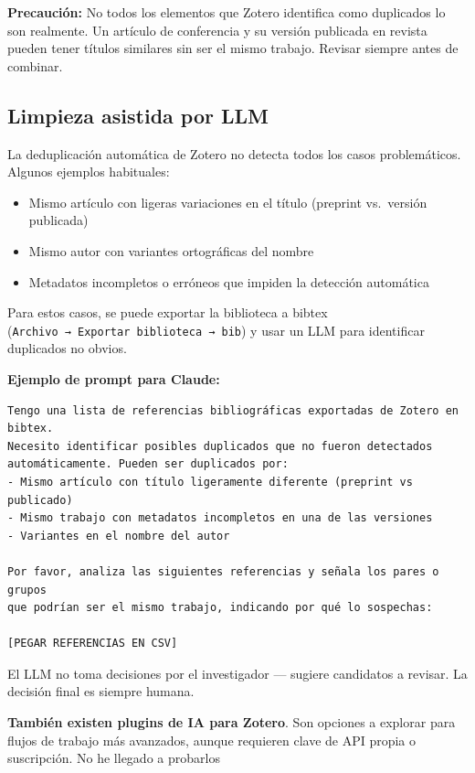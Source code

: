 \documentclass[
]{book}
\providecommand{\tightlist}{%
  \setlength{\itemsep}{0pt}\setlength{\parskip}{0pt}}
\begin{document}
\textbf{Precaución:} No todos los elementos que Zotero identifica como duplicados lo son realmente. Un artículo de conferencia y su versión publicada en revista pueden tener títulos similares sin ser el mismo trabajo. Revisar siempre antes de combinar.

\subsection{Limpieza asistida por LLM}\label{limpieza-asistida-por-llm}

La deduplicación automática de Zotero no detecta todos los casos problemáticos. Algunos ejemplos habituales:

\begin{itemize}
\tightlist
\item
  Mismo artículo con ligeras variaciones en el título (preprint vs.~versión publicada)
\item
  Mismo autor con variantes ortográficas del nombre
\item
  Metadatos incompletos o erróneos que impiden la detección automática
\end{itemize}

Para estos casos, se puede exportar la biblioteca a bibtex (\texttt{Archivo\ →\ Exportar\ biblioteca\ →\ bib}) y usar un LLM para identificar duplicados no obvios.

\textbf{Ejemplo de prompt para Claude:}

\begin{verbatim}
Tengo una lista de referencias bibliográficas exportadas de Zotero en bibtex.
Necesito identificar posibles duplicados que no fueron detectados
automáticamente. Pueden ser duplicados por:
- Mismo artículo con título ligeramente diferente (preprint vs publicado)
- Mismo trabajo con metadatos incompletos en una de las versiones
- Variantes en el nombre del autor

Por favor, analiza las siguientes referencias y señala los pares o grupos
que podrían ser el mismo trabajo, indicando por qué lo sospechas:

[PEGAR REFERENCIAS EN CSV]
\end{verbatim}

El LLM no toma decisiones por el investigador --- sugiere candidatos a revisar. La decisión final es siempre humana.

\textbf{También existen plugins de IA para Zotero}. Son opciones a explorar para flujos de trabajo más avanzados, aunque requieren clave de API propia o suscripción. No he llegado a probarlos
\end{document}
